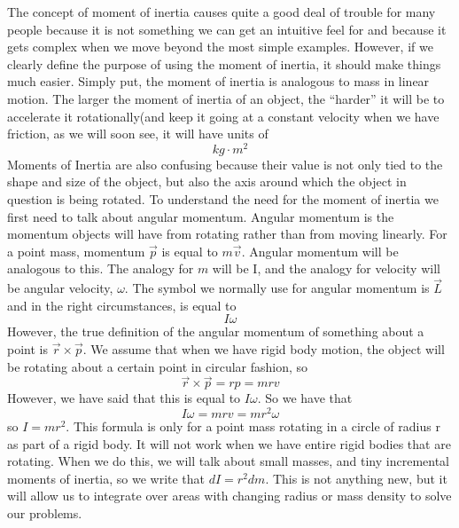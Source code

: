\newline

The concept of moment of inertia causes quite a good deal of trouble for many people because it is not something we can get an intuitive feel for and because it gets complex when we move beyond the most simple examples. However, if we clearly define the purpose of using the moment of inertia, it should make things much easier. Simply put, the moment of inertia is analogous to mass in linear motion. The larger the moment of inertia of an object, the “harder” it will be to accelerate it rotationally(and keep it going at a constant velocity when we have friction, as we will soon see, it will have units of $$kg \cdot m^2$$ Moments of Inertia are also confusing because their value is not only tied to the shape and size of the object, but also the axis around which the object in question is being rotated. To understand the need for the moment of inertia we first need to talk about angular momentum. Angular momentum is the momentum objects will have from rotating rather than from moving linearly. For a point mass, momentum $\vec{p}$ is equal to $m\vec{v}$. Angular momentum will be analogous to this. The analogy for $m$ will be I, and the analogy for velocity will be angular velocity, $\omega$. The symbol we normally use for angular momentum is $\vec{L}$ and in the right circumstances, is equal to $$I\omega$$ However, the true definition of the angular momentum of something about a point is $\vec{r} \times \vec{p}$. We assume that when we have rigid body motion, the object will be rotating about a certain point in circular fashion, so \begin{equation}\vec{r} \times \vec{p} = rp = mrv\end{equation} However, we have said that this is equal to $I\omega$. So we have that $$I\omega=mrv=mr^2\omega$$ so $I=mr^2$. This formula is only for a point mass rotating in a circle of radius r as part of a rigid body. It will not work when we have entire rigid bodies that are rotating. When we do this, we will talk about small masses, and tiny incremental moments of inertia, so we write that $dI=r^2 dm$. This is not anything new, but it will allow us to integrate over areas with changing radius or mass density to solve our problems. 

